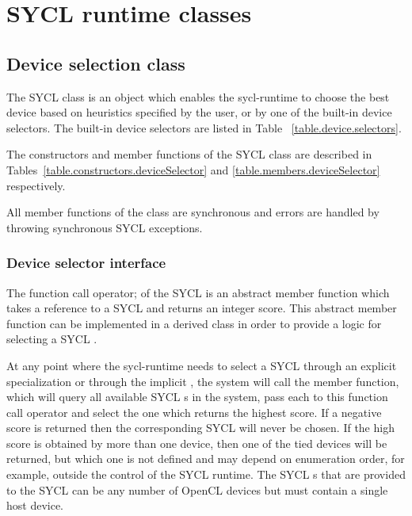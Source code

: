 \section{SYCL runtime classes}


\subsection{Device selection class}
\label{sec:device-selector}

The SYCL  class is an
object which enables the \gls{sycl-runtime} to choose the best device based
on heuristics specified by the user, or by one of the built-in device
selectors. The built-in device selectors are listed in Table
~\ref{table.device.selectors}.

The constructors and member functions of the SYCL  class are described in Tables~\ref{table.constructors.deviceSelector} and \ref{table.members.deviceSelector} respectively.

All member functions of the  class are synchronous and errors are handled by throwing synchronous SYCL exceptions.

\subsubsection{Device selector interface}

The function call operator;  of the SYCL  is an abstract member function which takes a reference to a SYCL  and returns an integer score.  This abstract member function can be implemented in a derived class in order to provide a logic for selecting a SYCL .

At any point where the \gls{sycl-runtime} needs to select a SYCL  through an explicit  specialization or through the implicit , the system will call the  member function, which will query all available SYCL s in the system, pass each to this function call operator and select the one which returns the highest score. If a negative score is returned then the corresponding SYCL  will never be chosen.  If the high score is obtained by more than one device, then one of the tied devices will be returned, but which one is not defined and may depend on enumeration order, for example, outside the control of the SYCL runtime. The SYCL s that are provided to the SYCL  can be any number of OpenCL devices but must contain a single host device.

